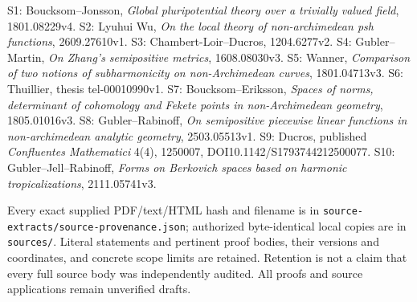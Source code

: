 \documentclass[
  10pt,
]{article}
\begin{document}
S1: Boucksom--Jonsson, \emph{Global pluripotential theory over a
trivially valued field}, 1801.08229v4. S2: Lyuhui Wu, \emph{On the local
theory of non-archimedean psh functions}, 2609.27610v1. S3:
Chambert-Loir--Ducros, 1204.6277v2. S4: Gubler--Martin, \emph{On Zhang's
semipositive metrics}, 1608.08030v3. S5: Wanner, \emph{Comparison of two
notions of subharmonicity on non-Archimedean curves}, 1801.04713v3. S6:
Thuillier, thesis tel-00010990v1. S7: Boucksom--Eriksson, \emph{Spaces
of norms, determinant of cohomology and Fekete points in non-Archimedean
geometry}, 1805.01016v3. S8: Gubler--Rabinoff, \emph{On semipositive
piecewise linear functions in non-archimedean analytic geometry},
2503.05513v1. S9: Ducros, published \emph{Confluentes Mathematici} 4(4),
1250007, DOI10.1142/S1793744212500077. S10: Gubler--Jell--Rabinoff,
\emph{Forms on Berkovich spaces based on harmonic tropicalizations},
2111.05741v3.

Every exact supplied PDF/text/HTML hash and filename is in
\texttt{source-extracts/source-provenance.json}; authorized
byte-identical local copies are in \texttt{sources/}. Literal statements
and pertinent proof bodies, their versions and coordinates, and concrete
scope limits are retained. Retention is not a claim that every full
source body was independently audited. All proofs and source
applications remain unverified drafts.
\end{document}
